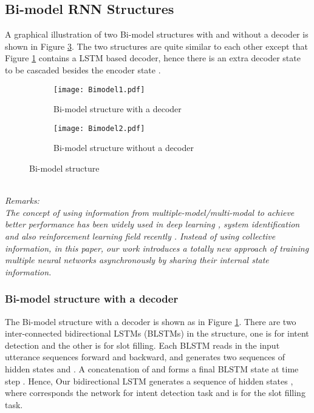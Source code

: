 \documentclass[11pt,a4paper]{article}
\begin{document}
\subsection{Bi-model RNN Structures}
A graphical illustration of two Bi-model structures with and without a decoder is shown in Figure \ref{bimodel}. The two structures are quite similar to each other except that Figure \ref{bimodel1} contains a LSTM based decoder, hence there is an extra decoder state  to be cascaded besides the encoder state . 
\begin{figure}
\begin{subfigure}{.5\textwidth}
  \centering
  \texttt{[image: Bimodel1.pdf]}
  \caption{Bi-model structure with a decoder}
  \label{bimodel1}
\end{subfigure}\hfill
\begin{subfigure}{.5\textwidth}
  \centering
  \texttt{[image: Bimodel2.pdf]}
  \caption{Bi-model structure without a decoder}
  \label{bimodel2}
\end{subfigure}
\caption{Bi-model structure}
\label{bimodel}
\end{figure}\\
{\it{Remarks:}\\
The concept of using information from multiple-model/multi-modal to achieve better performance has been widely used in deep learning  \cite{dean2012large, wang2017new,ngiam2011multimodal,srivastava2012multimodal}, system identification  \cite{murray1997multiple,narendra2014stability, narendra2015extension} and also  reinforcement learning field recently \cite{narendra2016fast,wang2018Boost}. Instead of using collective information, in this paper, our work introduces a totally new approach of training multiple neural networks asynchronously by sharing their internal state information.}

\subsubsection{Bi-model structure with a decoder}
The Bi-model structure with a decoder is shown as in Figure \ref{bimodel1}. There are two inter-connected bidirectional LSTMs (BLSTMs) in the structure, one is for intent detection and the other is for slot filling. Each BLSTM reads in the input utterance sequences  forward and backward, and generates two sequences of hidden states  and . A concatenation of  and  forms a final BLSTM state  at time step . Hence, Our bidirectional LSTM  generates a sequence of hidden states , where  corresponds the network for intent detection task and  is for the slot filling task. 
\end{document}
